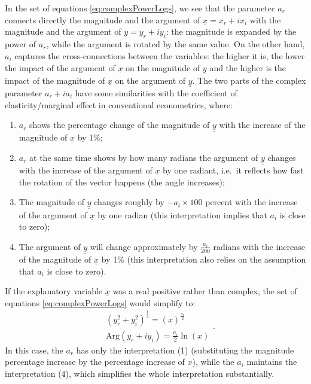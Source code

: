 \documentclass[
]{book}
\providecommand{\tightlist}{%
  \setlength{\itemsep}{0pt}\setlength{\parskip}{0pt}}
\begin{document}
In the set of equations \eqref{eq:complexPowerLogs}, we see that the parameter \(a_r\) connects directly the magnitude and the argument of \(\underline{x}=x_{r} + i x_{i}\) with the magnitude and the argument of \(\underline{y}=y_r + i y_i\): the magnitude is expanded by the power of \(a_r\), while the argument is rotated by the same value. On the other hand, \(a_i\) captures the cross-connections between the variables: the higher it is, the lower the impact of the argument of \(\underline{x}\) on the magnitude of \(\underline{y}\) and the higher is the impact of the magnitude of \(\underline{x}\) on the argument of \(\underline{y}\). The two parts of the complex parameter \(a_r + i a_i\) have some similarities with the coefficient of elasticity/marginal effect in conventional econometrics, where:

\begin{enumerate}
\def\labelenumi{\arabic{enumi}.}
\tightlist
\item
  \(a_r\) shows the percentage change of the magnitude of \(\underline{y}\) with the increase of the magnitude of \(\underline{x}\) by 1\%;
\item
  \(a_r\) at the same time shows by how many radians the argument of \(\underline{y}\) changes with the increase of the argument of \(\underline{x}\) by one radiant, i.e.~it reflects how fast the rotation of the vector happens (the angle increases);
\item
  The magnitude of \(\underline{y}\) changes roughly by \(-a_i \times 100\) percent with the increase of the argument of \(\underline{x}\) by one radian (this interpretation implies that \(a_i\) is close to zero);
\item
  The argument of \(\underline{y}\) will change approximately by \(\frac{a_i}{200}\) radians with the increase of the magnitude of \(\underline{x}\) by 1\% (this interpretation also relies on the assumption that \(a_i\) is close to zero).
\end{enumerate}

If the explanatory variable \(\underline{x}\) was a real positive rather than complex, the set of equations \eqref{eq:complexPowerLogs} would simplify to:
\begin{equation}
    \begin{aligned}
        & \left({y_r^2 + y_i^2}\right)^{\frac{1}{2}} = \left(x\right)^{\frac{a_{r}}{2}} \\
        & \mathrm{Arg}(y_r + i y_i) = \frac{a_{i}}{2} \ln \left(x\right)
    \end{aligned} .
    \label{eq:complexPowerLogsReal}
\end{equation}
In this case, the \(a_r\) has only the interpretation (1) (substituting the magnitude percentage increase by the percentage increase of \(x\)), while the \(a_i\) maintains the interpretation (4), which simplifies the whole interpretation substantially.
\end{document}
